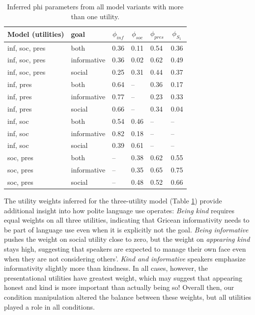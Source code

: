 \documentclass[9pt,twocolumn,twoside,lineno]{main_class_file}
\begin{document}
\begin{table}[tbp]
\begin{center}
\begin{threeparttable}
\caption{\label{tab:phi}Inferred phi parameters from all model variants with more than one utility.}
\begin{tabularx}{\columnwidth}{llllll}
\toprule
Model (utilities) & \multicolumn{1}{l}{goal} & \multicolumn{1}{c}{$\phi_{inf}$} & \multicolumn{1}{c}{$\phi_{soc}$} & \multicolumn{1}{c}{$\phi_{pres}$} & \multicolumn{1}{c}{$\phi_{S_1}$}\\
\midrule
inf, soc, pres & both & 0.36 & 0.11 & 0.54 & 0.36\\
inf, soc, pres & informative & 0.36 & 0.02 & 0.62 & 0.49\\
inf, soc, pres & social & 0.25 & 0.31 & 0.44 & 0.37\\
inf, pres & both & 0.64 & -- & 0.36 & 0.17\\
inf, pres & informative & 0.77 & -- & 0.23 & 0.33\\
inf, pres & social & 0.66 & -- & 0.34 & 0.04\\
inf, soc & both & 0.54 & 0.46 & -- & --\\
inf, soc & informative & 0.82 & 0.18 & -- & --\\
inf, soc & social & 0.39 & 0.61 & -- & --\\
soc, pres & both & -- & 0.38 & 0.62 & 0.55\\
soc, pres & informative & -- & 0.35 & 0.65 & 0.75\\
soc, pres & social & -- & 0.48 & 0.52 & 0.66\\
\bottomrule
\end{tabularx}
\end{threeparttable}
\end{center}
\end{table}


The utility weights inferred for the three-utility model (Table \ref{tab:phi})
provide additional insight into how polite language use operates:
\emph{Being kind} requires equal weights on all three utilities,
indicating that Gricean informativity needs to be part of language use
even when it is explicitly not the goal. 
\emph{Being informative} pushes
the weight on social utility close to zero, but the weight on
\emph{appearing kind} stays high, suggesting that speakers are expected
to manage their own face even when they are not considering others'.
\emph{Kind and informative} speakers emphasize informativity slightly
more than kindness. In all cases, however, the presentational utilities
have greatest weight, which may suggest that appearing honest and kind
is more important than actually being so! Overall then, our condition
manipulation altered the balance between these weights, but all
utilities played a role in all conditions.
\end{document}
